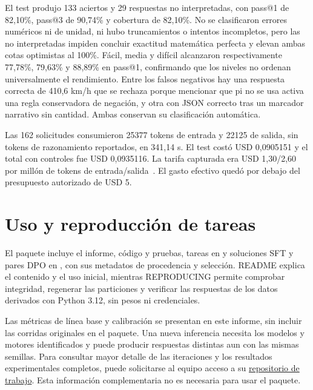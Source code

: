 El test produjo 133 aciertos y 29 respuestas no interpretadas, con pass@1 de
82,10\%, pass@3 de 90,74\% y cobertura de 82,10\%. No se clasificaron errores
numéricos ni de unidad, ni hubo truncamientos o intentos incompletos, pero las
no interpretadas impiden concluir exactitud matemática perfecta y elevan ambas
cotas optimistas al 100\%. Fácil, media y difícil alcanzaron respectivamente
77,78\%, 79,63\% y 88,89\% en pass@1, confirmando que los niveles no ordenan
universalmente el rendimiento. Entre los falsos negativos hay una respuesta
correcta de 410,6 km/h que se rechaza porque mencionar que pi no se usa activa
una regla conservadora de negación, y otra con JSON correcto tras un marcador
narrativo sin cantidad. Ambas conservan su clasificación automática.

Las 162 solicitudes consumieron 25377 tokens de entrada y 22125 de salida,
sin tokens de razonamiento reportados, en 341,14 s. El test costó USD 0,0905151
y el total con controles fue USD 0,0935116. La tarifa capturada era
USD 1,30/2,60 por millón de tokens de entrada/salida~\cite{routing,pricing}.
El gasto efectivo quedó por debajo del presupuesto autorizado de USD 5.

\section{Uso y reproducción de tareas}
El paquete incluye el informe, código y pruebas, tareas en 
y soluciones SFT y pares DPO en , con sus metadatos de
procedencia y selección. README explica el contenido y el uso inicial, mientras
REPRODUCING permite comprobar integridad, regenerar las particiones y verificar
las respuestas de los datos derivados con Python 3.12, sin pesos ni credenciales.

Las métricas de línea base y calibración se presentan en este informe, sin
incluir las corridas originales en el paquete. Una nueva inferencia necesita
los modelos y motores identificados y puede producir respuestas distintas aun
con las mismas semillas. Para consultar mayor detalle de las iteraciones y
los resultados experimentales completos, puede solicitarse al equipo acceso a
su \href{https://github.com/spmasabeu/research-challenge-ia-gen-202602}{repositorio de trabajo}.
Esta información complementaria no es necesaria para usar el paquete.

